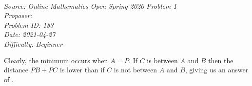 \SSbreak\\
\emph{Source: Online Mathematics Open Spring 2020 Problem 1}\\
\emph{Proposer: \Pnjoy}\\ %
\emph{Problem ID: 183}\\
\emph{Date: 2021-04-27}\\
\emph{Difficulty: Beginner}\\
\SSbreak

\bigskip

\begin{solution}\hfil\medskip
	
	Clearly, the minimum occurs when $A = P$. If $C$ is between $A$ and $B$ then the distance $PB + PC$ is lower than if $C$ is not between $A$ and $B$, giving us an answer of . 
\end{solution}\bigskip
